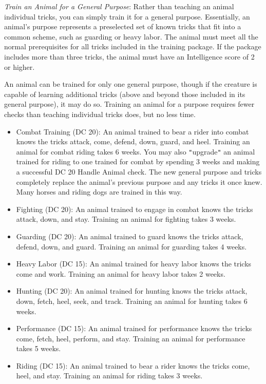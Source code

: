 \textit{Train an Animal for a General Purpose}: Rather than teaching an animal individual tricks, you can simply train it for a general purpose. Essentially, an animal's purpose represents a preselected set of known tricks that fit into a common scheme, such as guarding or heavy labor. The animal must meet all the normal prerequisites for all tricks included in the training package. If the package includes more than three tricks, the animal must have an Intelligence score of 2 or higher.
				
An animal can be trained for only one general purpose, though if the creature is capable of learning additional tricks (above and beyond those included in its general purpose), it may do so. Training an animal for a purpose requires fewer checks than teaching individual tricks does, but no less time.
				\begin{itemize}\item  Combat Training (DC 20): An animal trained to bear a rider into combat knows the tricks attack, come, defend, down, guard, and heel. Training an animal for combat riding takes 6 weeks. You may also \texttt{{}"{}}upgrade\texttt{{}"{}} an animal trained for riding to one trained for combat by spending 3 weeks and making a successful DC 20 Handle Animal check. The new general purpose and tricks completely replace the animal's previous purpose and any tricks it once knew. Many horses and riding dogs are trained in this way.
				\item  Fighting (DC 20): An animal trained to engage in combat knows the tricks attack, down, and stay. Training an animal for fighting takes 3 weeks.
				\item  Guarding (DC 20): An animal trained to guard knows the tricks attack, defend, down, and guard. Training an animal for guarding takes 4 weeks.
				\item  Heavy Labor (DC 15): An animal trained for heavy labor knows the tricks come and work. Training an animal for heavy labor takes 2 weeks.
				\item  Hunting (DC 20): An animal trained for hunting knows the tricks attack, down, fetch, heel, seek, and track. Training an animal for hunting takes 6 weeks.
				\item  Performance (DC 15): An animal trained for performance knows the tricks come, fetch, heel, perform, and stay. Training an animal for performance takes 5 weeks.
				\item  Riding (DC 15): An animal trained to bear a rider knows the tricks come, heel, and stay. Training an animal for riding takes 3 weeks.
\end{itemize}
				
